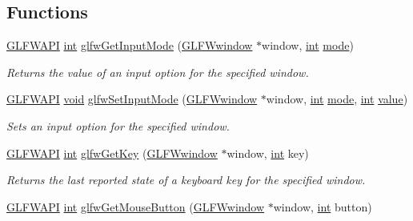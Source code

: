 \subsection*{Functions}
\begin{DoxyCompactItemize}
\item 
\hyperlink{glfw3_8h_a56da5036b2cc259351ae22fd6439bb47}{G\-L\-F\-W\-A\-P\-I} \hyperlink{wglew_8h_a500a82aecba06f4550f6849b8099ca21}{int} \hyperlink{group__input_ga1248dd5b1e566b2817e71547564d6af9}{glfw\-Get\-Input\-Mode} (\hyperlink{group__window_ga3c96d80d363e67d13a41b5d1821f3242}{G\-L\-F\-Wwindow} $\ast$window, \hyperlink{wglew_8h_a500a82aecba06f4550f6849b8099ca21}{int} \hyperlink{glew_8h_a1e71d9c196e4683cc06c4b54d53f7ef5}{mode})
\begin{DoxyCompactList}\small\item\em Returns the value of an input option for the specified window. \end{DoxyCompactList}\item 
\hyperlink{glfw3_8h_a56da5036b2cc259351ae22fd6439bb47}{G\-L\-F\-W\-A\-P\-I} \hyperlink{wglew_8h_aeea6e3dfae3acf232096f57d2d57f084}{void} \hyperlink{group__input_gae1eb729d2dd91dc33fd60e150a6e1684}{glfw\-Set\-Input\-Mode} (\hyperlink{group__window_ga3c96d80d363e67d13a41b5d1821f3242}{G\-L\-F\-Wwindow} $\ast$window, \hyperlink{wglew_8h_a500a82aecba06f4550f6849b8099ca21}{int} \hyperlink{glew_8h_a1e71d9c196e4683cc06c4b54d53f7ef5}{mode}, \hyperlink{wglew_8h_a500a82aecba06f4550f6849b8099ca21}{int} \hyperlink{glew_8h_a6a4f8a1a444e9080b297963b3db29fe0}{value})
\begin{DoxyCompactList}\small\item\em Sets an input option for the specified window. \end{DoxyCompactList}\item 
\hyperlink{glfw3_8h_a56da5036b2cc259351ae22fd6439bb47}{G\-L\-F\-W\-A\-P\-I} \hyperlink{wglew_8h_a500a82aecba06f4550f6849b8099ca21}{int} \hyperlink{group__input_ga7d8ad8ffaf272808f04e1d5d33ec8859}{glfw\-Get\-Key} (\hyperlink{group__window_ga3c96d80d363e67d13a41b5d1821f3242}{G\-L\-F\-Wwindow} $\ast$window, \hyperlink{wglew_8h_a500a82aecba06f4550f6849b8099ca21}{int} key)
\begin{DoxyCompactList}\small\item\em Returns the last reported state of a keyboard key for the specified window. \end{DoxyCompactList}\item 
\hyperlink{glfw3_8h_a56da5036b2cc259351ae22fd6439bb47}{G\-L\-F\-W\-A\-P\-I} \hyperlink{wglew_8h_a500a82aecba06f4550f6849b8099ca21}{int} \hyperlink{group__input_ga6da5efb04f700c312a57a169fa9393a0}{glfw\-Get\-Mouse\-Button} (\hyperlink{group__window_ga3c96d80d363e67d13a41b5d1821f3242}{G\-L\-F\-Wwindow} $\ast$window, \hyperlink{wglew_8h_a500a82aecba06f4550f6849b8099ca21}{int} button)

\end{DoxyCompactItemize}
